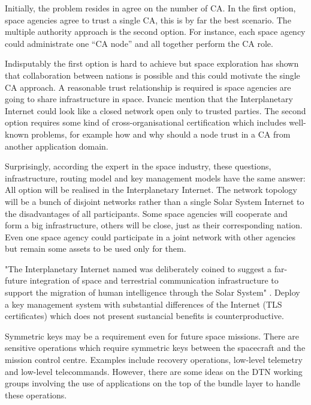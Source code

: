 Initially, the problem resides in agree on the number of CA. In the first option, space agencies agree to trust a single CA, this is by far the best scenario. The multiple authority approach is the second option. For instance, each space agency could administrate one ``CA node'' and all together perform the CA role. 

Indisputably the first option is hard to achieve but space exploration has shown that collaboration between nations is possible and this could motivate the single CA approach. A reasonable trust relationship is required is space agencies are going to share infrastructure in space. Ivancic \cite{ivancic2009security} mention that the Interplanetary Internet could look like a closed network open only to trusted parties. The second option requires some kind of cross-organisational certification which includes well-known problems, for example how and why should a node trust in a CA from another application domain. 


Surprisingly, according the expert in the space industry, these questions, infrastructure, routing model and key management models have the same answer: All option will be realised in the Interplanetary Internet. The network topology will be a bunch of disjoint networks rather than a single Solar System Internet to the disadvantages of all participants. Some space agencies will cooperate and form a big infrastructure, others will be close, just as their corresponding nation. Even one space agency could participate in a joint network with other agencies but remain some assets to be used only for them.  




"The Interplanetary Internet named was deliberately coined to suggest a far-future integration of space and terrestrial communication infrastructure to support the migration of human intelligence through the Solar System" \cite{burleigh2003interplanetary}. Deploy a key management system with substantial differences of the Internet (TLS certificates) which does not present sustancial benefits is counterproductive. 


Symmetric keys may be a requirement even for future space missions. There are sensitive operations which require symmetric keys between the spacecraft and the mission control centre. Examples include recovery operations, low-level telemetry and low-level telecommands.  However, there are some ideas on the DTN working groups involving the use of applications on the top of the bundle layer to handle these operations. 

